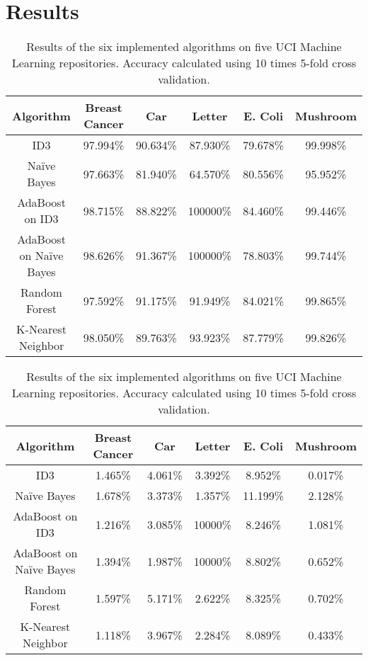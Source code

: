 \documentclass[11pt]{article}
\begin{document}
\section{Results}
\begin{table}
  \begin{tabular}{ |c|c|c|c|c|c| }
    \hline
    Algorithm               & Breast Cancer & Car      & Letter   & E. Coli  & Mushroom \\ \hline
    ID3                     & 97.994\%      & 90.634\% & 87.930\% & 79.678\% & 99.998\% \\ \hline
    Naïve Bayes             & 97.663\%      & 81.940\% & 64.570\% & 80.556\% & 95.952\% \\ \hline
    AdaBoost on ID3         & 98.715\%      & 88.822\% & 100000\% & 84.460\% & 99.446\% \\ \hline
    AdaBoost on Naïve Bayes & 98.626\%      & 91.367\% & 100000\% & 78.803\% & 99.744\% \\ \hline
    Random Forest           & 97.592\%      & 91.175\% & 91.949\% & 84.021\% & 99.865\% \\ \hline
    K-Nearest Neighbor      & 98.050\%      & 89.763\% & 93.923\% & 87.779\% & 99.826\% \\ \hline
  \end{tabular}
  \caption{Results of the six implemented algorithms on five UCI Machine Learning repositories. Accuracy calculated using 10 times 5-fold cross validation.}
  \label{table:accuracies}
\end{table}

\begin{table}
  \begin{tabular}{ |c|c|c|c|c|c| }
    \hline
    Algorithm               & Breast Cancer & Car      & Letter   & E. Coli  & Mushroom \\ \hline
    ID3                     & 1.465\%       & 4.061\%  & 3.392\%  & 8.952\%  & 0.017\%  \\ \hline
    Naïve Bayes             & 1.678\%       & 3.373\%  & 1.357\% & 11.199\%  & 2.128\%  \\ \hline
    AdaBoost on ID3         & 1.216\%       & 3.085\%  & 10000\%  & 8.246\% & 1.081\%  \\ \hline
    AdaBoost on Naïve Bayes & 1.394\%       & 1.987\%  & 10000\%  & 8.802\% & 0.652\%  \\ \hline
    Random Forest           & 1.597\%       & 5.171\%  & 2.622\%  & 8.325\% & 0.702\%  \\ \hline
    K-Nearest Neighbor      & 1.118\%       & 3.967\%  & 2.284\%  & 8.089\% & 0.433\%  \\ \hline
  \end{tabular}
  \caption{Results of the six implemented algorithms on five UCI Machine Learning repositories. Accuracy calculated using 10 times 5-fold cross validation.}
\end{table}
\end{document}

